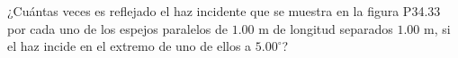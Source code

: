 \item ¿Cuántas veces es reflejado el haz incidente que se muestra en la figura P34.33 por cada uno de los espejos paralelos de $1.00\text{ m}$ de longitud separados $1.00\text{ m}$, si el haz incide en el extremo de uno de ellos a $5.00^\circ$?